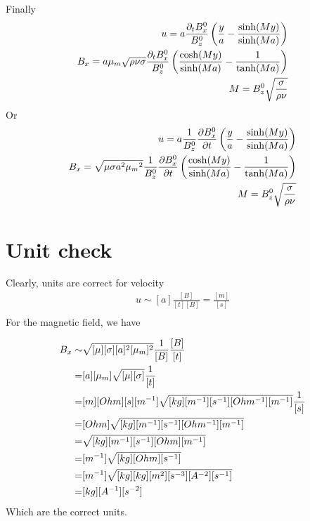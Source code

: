 \documentclass[11pt]{article}
\begin{document}
Finally
\begin{equation}\begin{aligned}
u   = a \frac{\partial_t B_x^0}{ B_z^0} \left( \frac{y}{a} - \frac{\sinh(M y)}{\sinh(M a)} \right) \\
B_x = a {\mu_m} \sqrt{\rho \nu \sigma} \frac{\partial_t B_x^0}{B_z^0} \left( \frac{\cosh(M y)}{\sinh(M a)} - \frac{1}{\tanh(M a)} \right) \\
M = B_z^0 \sqrt{\frac{\sigma}{\rho \nu}} \\
\end{aligned} \end{equation}
Or
\begin{equation}\begin{aligned}
u   = a \frac{1}{B_z^0} \frac{\partial B_x^0}{\partial t} \left( \frac{y}{a} - \frac{\sinh(M y)}{\sinh(M a)} \right) \\
B_x = \sqrt{\mu \sigma a^2 {\mu_m}^2} \frac{1}{B_z^0} \frac{\partial B_x^0}{\partial t} \left( \frac{\cosh(M y)}{\sinh(M a)} - \frac{1}{\tanh(M a)} \right) \\
M = B_z^0 \sqrt{\frac{\sigma}{\rho \nu}} \\
\end{aligned} \end{equation}

\section{Unit check}
Clearly, units are correct for velocity
\begin{equation}\begin{aligned}
u  \sim [a] \frac{[B]}{[t] [B]} = \frac{[m]}{[s]} \\
\end{aligned} \end{equation}
For the magnetic field, we have

\begin{equation}\begin{aligned}
B_x \sim & \sqrt{[\mu] [\sigma] [a]^2 [{\mu_m}]^2} \frac{1}{[B]} \frac{[B]}{[t]}  \\
       = & [a] [{\mu_m}] \sqrt{[\mu] [\sigma]} \frac{1}{[t]} \\
       = & [m] [Ohm] [s] [m^{-1}] \sqrt{[kg] [m^{-1}] [s^{-1}] [Ohm^{-1}] [m^{-1}]} \frac{1}{[s]} \\
       = & [Ohm] \sqrt{[kg] [m^{-1}] [s^{-1}] [Ohm^{-1}] [m^{-1}]} \\
       = & \sqrt{[kg] [m^{-1}] [s^{-1}] [Ohm] [m^{-1}]} \\
       = & [m^{-1}] \sqrt{[kg] [Ohm] [s^{-1}]} \\
       = & [m^{-1}] \sqrt{[kg] [kg] [m^2] [s^{-3}] [A^{-2}] [s^{-1}]} \\
       = & [kg] [A^{-1}] [s^{-2}] \\
\end{aligned} \end{equation}
Which are the correct units.
\end{document}
